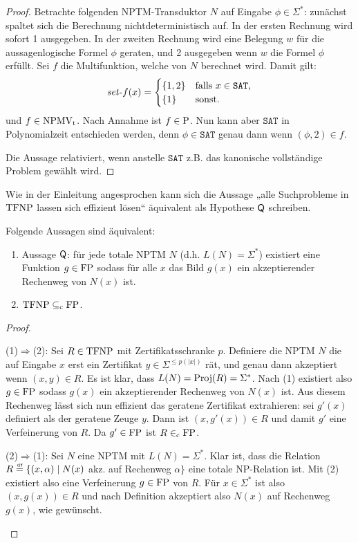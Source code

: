 \begin{proof}
    Betrachte folgenden NPTM-Transduktor $N$ auf Eingabe $\phi\in\Sigma^*$: zunächst spaltet sich die Berechnung nichtdeterministisch auf. In der ersten Rechnung wird sofort 1 ausgegeben. In der zweiten Rechnung wird eine Belegung $w$ für die aussagenlogische Formel $\phi$ geraten, und 2 ausgegeben wenn $w$ die Formel $\phi$ erfüllt. Sei $f$ die Multifunktion, welche von $N$ berechnet wird.
    Damit gilt:
    \[ \fset{}f(x) = \begin{cases} \{ 1, 2\} & \text{falls $x\in\mathtt{SAT}$,} \\ \{ 1\} & \text{sonst. } \end{cases} \]
    und $f\in\NPMVt$.
    Nach Annahme ist $f\in \P$. Nun kann aber $\mathtt{SAT}$ in Polynomialzeit entschieden werden, denn $\phi\in\mathtt{SAT}$ genau dann wenn $(\phi, 2) \in f$.

    Die Aussage relativiert, wenn anstelle $\mathtt{SAT}$ z.B. das kanonische vollständige Problem gewählt wird.
\end{proof}
Wie in der Einleitung angesprochen kann sich die Aussage „alle Suchprobleme in $\TFNP$ lassen sich effizient lösen“ äquivalent als Hypothese $\hQ$ schreiben.
\begin{observation}\label{obs:tfnp-q}
    Folgende Aussagen sind äquivalent:
    \begin{enumerate}
        \item Aussage $\hQ$: für jede totale NPTM $N$ (d.h. $L(N)=\Sigma^*$) existiert eine Funktion $g\in\FP$ sodass für alle $x$ das Bild $g(x)$ ein akzeptierender Rechenweg von $N(x)$ ist. 
        \item $\TFNP\subseteqc \FP$.
    \end{enumerate}
\end{observation}
\begin{proof}
\begin{prooflist}
\item (1)$\Rightarrow$(2): Sei $R\in\TFNP$ mit Zertifikatsschranke $p$. Definiere die NPTM $N$ die auf Eingabe $x$ erst ein Zertifikat $y\in\Sigma^{\leq p(|x|)}$ rät, und genau dann akzeptiert wenn $(x,y)\in R$. Es ist klar, dass $L(N)=\Proj(R)=\Sigma^*$. Nach (1) existiert also $g\in\FP$ sodass $g(x)$ ein akzeptierender Rechenweg von $N(x)$ ist. Aus diesem Rechenweg lässt sich nun effizient das geratene Zertifikat extrahieren: sei $g'(x)$ definiert als der geratene Zeuge $y$. Dann ist $(x,g'(x))\in R$ und damit $g'$ eine Verfeinerung von $R$. Da $g'\in\FP$ ist $R\inc\FP$.

\item (2)$\Rightarrow$(1): Sei $N$ eine NPTM mit $L(N)=\Sigma^*$. Klar ist, dass die Relation $R\defeq \{ (x,\alpha) \mid N(x)$ akz. auf Rechenweg $\alpha\}$ eine totale NP-Relation ist.
    Mit (2) existiert also eine Verfeinerung $g\in\FP$ von $R$. Für $x\in\Sigma^*$ ist also $(x, g(x))\in R$ und nach Definition akzeptiert also $N(x)$ auf Rechenweg $g(x)$, wie gewünscht.
\end{prooflist}
\end{proof}

